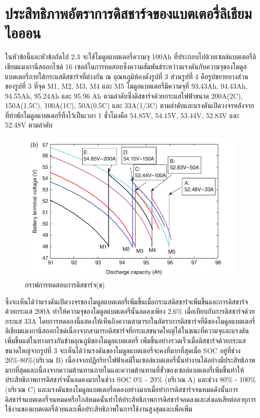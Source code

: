 \section{ประสิทธิภาพอัตราการดิสชาร์จของแบตเตอรี่ลิเธียมไอออน}
ในหัวข้อนี้และหัวข้อถัดไป 2.3 จะใช้โมดูลแบตเตอรี่ความจุ 100Ah ที่ประกอบไปด้วยเซลล์แบตเตอรี่ลิเธียมแมงกานีสออกไซด์ 16 เซลล์ในการทดสอบซึ่งความสัมพันธ์ระหว่างแรงดันกับความจุของโมดูลแบตเตอรี่ภายใต้กระแสดิสชาร์จที่ต่างกัน ณ อุณหภูมิห้องดังรูปที่ 3 ส่วนรูปที่ 4 คือรูปขยายบางส่วนของรูปที่ 3 ที่จุด M1, M2, M3, M4 และ M5 โมดูลแบตเตอรี่มีความจุที่ 93.43Ah, 94.43Ah, 94.55Ah, 95.24Ah และ 95.96 Ah ตามลำดับซึ่งดิสชาร์จด้วยกระแสไฟฟ้าขนาด 200A(2C), 150A(1.5C), 100A(1C), 50A(0.5C) และ 33A(1/3C) ตามลำดับและแรงดันเปิดวงจรหลังจากที่ทำพักโมดูลแบตเตอรี่ทิ้งไว้เป็นเวลา 1 ชั่วโมงคือ 54.85V, 54.15V, 53.44V, 52.83V และ 52.48V ตามลำดับ
\begin{center}
	\begin{figure}[H]
		\includegraphics[width=0.6\linewidth]{Chapters/img/IV_b.png}
			\centering
			\captionsetup{justification=centering,margin=2cm}
			\caption{กราฟการทดสอบการดิสชาร์จ(ข)}
	\end{figure}
\end{center}
ซึ่งจะเห็นได้ว่าแรงดันเปิดวงจรของโมดูลแบตเตอรี่เพิ่มขึ้นเมื่อกระแสดิสชาร์จเพิ่มขึ้นและการดิสชาร์จด้วยกระแส 200A ทำให้ความจุของโมดูลแบตเตอรี่นั้นลดลงเพียง 2.6\% เมื่อเทียบกับการดิสชาร์จด้วยกระแส 33A โดยการทดลองนี้แสดงให้เห็นถึงความสามารถในอัตราการดิสชาร์จที่ดีของโมดูลแบตเตอรี่ลิเธียมแมงกานีสออกไซด์เนื่องจากสามารถดิสชาร์จที่กระแสขนาดใหญ่ได้ในขณะที่ความจุเเละแรงดันเพิ่มขึ้นแต่ในทางตรงกันข้ามอุณภูมิของโมดูลแบตเตอรี่
เพิ่มขึ้นอย่างรวดเร็วเมื่อดิสชาร์จด้วยกระแสขนาดใหญ่จากรูปที่ 3 จะเห็นได้ว่าแรงดันของโมดูลแบตเตอรี่จะคงที่มากที่สุดเมื่อ SOC อยู่ที่ช่วง 20\%-80\%(บริเวณ B) เนื่องจากปฏิกริยาไฟฟ้าเคมีในเซลล์แบตเตอรี่นั้นทำงานได้อย่างมีประสิทธิภาพมากที่สุดและเนื่องจากความต้านทานภายในและความต้านทานที่ขั้วของเซลล์แบตเตอรี่เพิ่มขึ้นทำให้ประสิทธิภาพการดิสชาร์จนั้นลดลงมากในช่วง SOC 0\% - 20\%
(บริเวณ A) และช่วง 80\% - 100\%(บริเวณ C) และแรงดันของโมดูลแบตเตอรี่ลดลงอย่างมากเมื่อทำการดิสชาร์จจนหมดดังนั้นการ\\ดิสชาร์จแบตเตอรี่จนหมดหรือใกล้หมดนั้นทำให้ประสิทธิภาพการดิสชาร์จลดลงและส่งผลเสียต่ออายุการใช้งานของแบตเตอรี่ด้วยและเพื่อประสิทธิภาพในการใช้งานสูงสุดและเพื่อเพิ่ม
